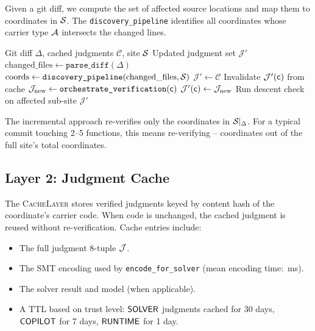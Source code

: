 \documentclass[11pt]{article}
\newcommand{\CacheLayer}{\textsc{CacheLayer}}
\begin{document}
Given a git diff, we compute the set of affected source locations and map them
to coordinates in $\mathcal{S}$. The \texttt{discovery\_pipeline} identifies all
coordinates whose carrier type $\mathcal{A}$ intersects the changed lines.

\begin{algorithm}[t]
\caption{Diff-Based Incremental Verification}
\label{alg:incremental}
\begin{algorithmic}[1]
\REQUIRE Git diff $\Delta$, cached judgments $\mathcal{C}$, site $\mathcal{S}$
\ENSURE Updated judgment set $\mathcal{J}'$
\STATE $\text{changed\_files} \gets \texttt{parse\_diff}(\Delta)$
\STATE $\text{coords} \gets \texttt{discovery\_pipeline}(\text{changed\_files}, \mathcal{S})$
\STATE $\mathcal{J}' \gets \mathcal{C}$  
  \STATE Invalidate $\mathcal{J}'(\mathsf{c})$ from cache
  \STATE $\mathcal{J}_{\text{new}} \gets \texttt{orchestrate\_verification}(\mathsf{c})$
  \STATE $\mathcal{J}'(\mathsf{c}) \gets \mathcal{J}_{\text{new}}$
\ENDFOR
\STATE Run descent check on affected sub-site
\RETURN $\mathcal{J}'$
\end{algorithmic}
\end{algorithm}

The incremental approach re-verifies only the coordinates in
$\mathcal{S}|_\Delta$. For a typical commit touching 2--5 functions, this means
re-verifying \expCoordsMin{}--\expCoordsMax{} coordinates out of the full
site's \compCoordsSum{} total coordinates.

\subsection{Layer 2: Judgment Cache}

The \CacheLayer{} stores verified judgments keyed by content hash of the
coordinate's carrier code. When code is unchanged, the cached judgment is
reused without re-verification. Cache entries include:

\begin{itemize}[leftmargin=*]
  \item The full judgment 8-tuple $\mathcal{J}$.
  \item The SMT encoding used by \texttt{encode\_for\_solver}
        (mean encoding time: \compProfEncodeForSolverMeanMs{}\,ms).
  \item The solver result and model (when applicable).
  \item A TTL based on trust level: $\mathsf{SOLVER}$ judgments cached for 30 days,
        $\mathsf{COPILOT}$ for 7 days, $\mathsf{RUNTIME}$ for 1 day.
\end{itemize}
\end{document}
